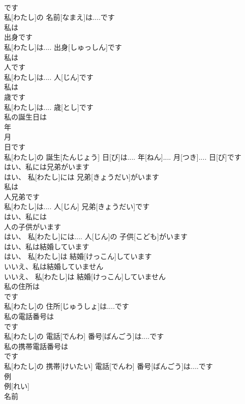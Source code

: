 \documentclass[8pt]{extreport}
\begin{document}
\begin{CJK}{UTF8}{min}
\\	です 
\\	私[わたし]の 名前[なまえ]は....です	
\\	私は 
\\	出身です
\\	私[わたし]は.... 出身[しゅっしん]です	
\\	私は 
\\	人です 
\\	私[わたし]は.... 人[じん]です	
\\	私は 
\\	歳です
\\	私[わたし]は.... 歳[とし]です	
\\	私の誕生日は 
\\	年 
\\	月 
\\	日です
\\	私[わたし]の 誕生[たんじょう] 日[び]は.... 年[ねん].... 月[つき].... 日[び]です	
\\	はい、私には兄弟がいます 
\\	はい、 私[わたし]には 兄弟[きょうだい]がいます	
\\	私は 
\\	人兄弟です
\\	私[わたし]は.... 人[じん] 兄弟[きょうだい]です	
\\	はい、私には 
\\	人の子供がいます
\\	はい、 私[わたし]には.... 人[じん]の 子供[こども]がいます	
\\	はい、私は結婚しています
\\	はい、 私[わたし]は 結婚[けっこん]しています	
\\	いいえ、私は結婚していません 
\\	いいえ、 私[わたし]は 結婚[けっこん]していません	
\\	私の住所は 
\\	です
\\	私[わたし]の 住所[じゅうしょ]は....です	
\\	私の電話番号は 
\\	です
\\	私[わたし]の 電話[でんわ] 番号[ばんごう]は....です	
\\	私の携帯電話番号は 
\\	です
\\	私[わたし]の 携帯[けいたい] 電話[でんわ] 番号[ばんごう]は....です	
\\	例
\\	例[れい]	
\\	名前 

\end{CJK}
\end{document}
